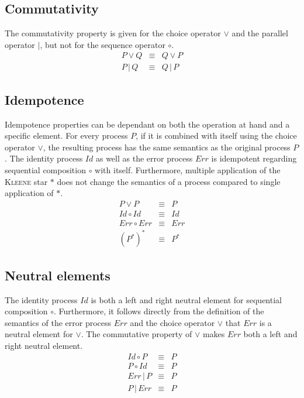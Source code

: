 \subsection{Commutativity}
The commutativity property is given for the choice operator $\vee$ and the parallel operator $|$, but not for the sequence operator $\circ$.
\begin{eqnarray*}
  P \vee Q & \equiv & Q \vee P \\
  P \,|\, Q & \equiv & Q \,|\, P
\end{eqnarray*}

\subsection{Idempotence}
Idempotence properties can be dependant on both the operation at hand and a specific element. For every process $P$, if it is combined with itself using the choice operator $\vee$, the resulting process has the same semantics as the original process $P$. The identity process $Id$ as well as the error process $Err$ is idempotent regarding sequential composition $\circ$ with itself. Furthermore, multiple application of the \textsc{Kleene} star $*$ does not change the semantics of a process compared to single application of $*$.
\begin{eqnarray*}
  P \vee P & \equiv & P \\
  Id \circ Id & \equiv & Id \\
  Err \circ Err & \equiv & Err \\
  (P^*)^* & \equiv & P^*
\end{eqnarray*}

\subsection{Neutral elements}
The identity process $Id$ is both a left and right neutral element for sequential composition $\circ$. Furthermore, it follows directly from the definition of the semantics of the error process $Err$ and the choice operator $\vee$ that $Err$ is a neutral element for $\vee$. The commutative property of $\vee$ makes $Err$ both a left and right neutral element.
\begin{eqnarray*}
  Id \circ P & \equiv & P \\
  P \circ Id & \equiv & P \\
  Err \,|\, P & \equiv & P \\
  P \,|\, Err & \equiv & P
\end{eqnarray*}